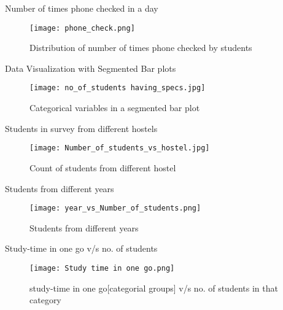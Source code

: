 \documentclass{beamer}
\begin{document}
\begin{frame}
\begin{block}{Number of times phone checked in a day}
\begin{figure}[hbtp]
\caption{Distribution of number of times phone checked by students}
\centering
\texttt{[image: phone\_check.png]}
\end{figure}
\end{block}
\end{frame}

\begin{frame}
\begin{block}{Data Visualization with Segmented Bar plots}
\begin{figure}[hbtp]
\caption{Categorical variables in a segmented bar plot}
\centering
\texttt{[image: no\_of\_students having\_specs.jpg]}
\end{figure}
\end{block}
\end{frame}

\begin{frame}
\begin{block}{Students in survey from different hostels}
\begin{figure}[hbtp]
\caption{Count of students from different hostel}
\centering
\texttt{[image: Number\_of\_students\_vs\_hostel.jpg]}
\end{figure}
\end{block}
\end{frame}

\begin{frame}
\begin{block}{Students from different years}
\begin{figure}[hbtp]
\caption{Students from different years}
\centering
\texttt{[image: year\_vs\_Number\_of\_students.png]}
\end{figure}
\end{block}
\end{frame}

\begin{frame}
\begin{block}{Study-time in one go v/s no. of students}
\begin{figure}[hbtp]
\caption{study-time in one go[categorial groups] v/s no. of students in that category}
\centering
\texttt{[image: Study time in one go.png]}
\end{figure}
\end{block}
\end{frame}
\end{document}
